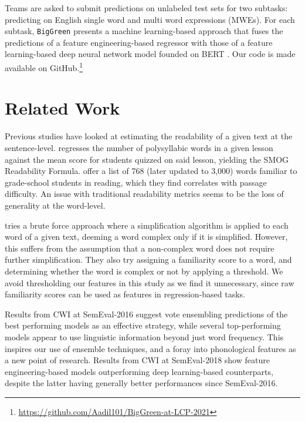 \documentclass[11pt,a4paper]{article}
\begin{document}
Teams are asked to submit predictions on unlabeled test sets for two subtasks: predicting on English single word and multi word expressions (MWEs). For each subtask, \texttt{BigGreen} presents a machine learning-based approach that fuses the predictions of a feature engineering-based regressor with those of a feature learning-based deep neural network model founded on BERT \citep{devlin2018bert}. Our code is made available on GitHub.\footnote{\url{https://github.com/Aadil101/BigGreen-at-LCP-2021}}

\section{Related Work}

Previous studies have looked at estimating the readability of a given text at the sentence-level. \citet{mc1969smog} regresses the number of polysyllabic words in a given lesson against the mean score for students quizzed on said lesson, yielding the SMOG Readability Formula. \citet{dale1948formula} offer a list of 768 (later updated to 3,000) words familiar to grade-school students in reading, which they find correlates with passage difficulty. An issue with traditional readability metrics seems to be the loss of generality at the word-level.

\citet{shardlow2013comparison} tries a brute force approach where a simplification algorithm is applied to each word of a given text, deeming a word complex only if it is simplified. However, this suffers from the assumption that a non-complex word does not require further simplification. They also try assigning a familiarity score to a word, and determining whether the word is complex or not by applying a threshold. We avoid thresholding our features in this study as we find it unnecessary, since raw familiarity scores can be used as features in regression-based tasks. 

Results from CWI at SemEval-2016 \citep{zampieri2017complex} suggest vote ensembling predictions of the best performing models as an effective strategy, while several top-performing models \citep{paetzold2016sv000gg, ronzano2016taln, mukherjee2016ju_nlp} appear to use linguistic information beyond just word frequency. This inspires our use of ensemble techniques, and a foray into phonological features as a new point of research. Results from CWI at SemEval-2018 show feature engineering-based models outperforming deep learning-based counterparts, despite the latter having generally better performances since SemEval-2016.
\end{document}
